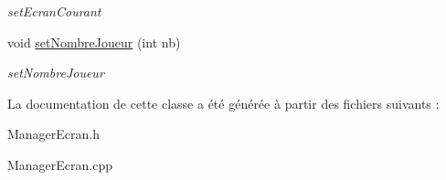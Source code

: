 \begin{DoxyCompactItemize}
\begin{DoxyCompactList}\small\item\em set\-Ecran\-Courant \end{DoxyCompactList}\item 
\hypertarget{classManagerEcran_a5e1c6000fc4baf622b2b460c28986c00}{void \hyperlink{classManagerEcran_a5e1c6000fc4baf622b2b460c28986c00}{set\-Nombre\-Joueur} (int nb)}\label{classManagerEcran_a5e1c6000fc4baf622b2b460c28986c00}

\begin{DoxyCompactList}\small\item\em set\-Nombre\-Joueur \end{DoxyCompactList}\end{DoxyCompactItemize}


\-La documentation de cette classe a été générée à partir des fichiers suivants \-:\begin{DoxyCompactItemize}
\item 
\-Manager\-Ecran.\-h\item 
\-Manager\-Ecran.\-cpp\end{DoxyCompactItemize}
